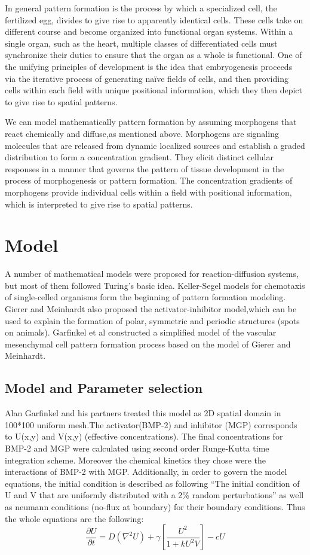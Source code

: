 \documentclass[12pt]{article}
\begin{document}
  In general pattern formation is the process by which a specialized cell, the fertilized egg, divides to give rise to apparently identical cells. These cells take on different course and become organized into functional organ systems. 
  Within a single organ, such as the heart, multiple classes of differentiated cells must synchronize their duties to ensure that the organ as a whole is functional. 
  One of the unifying principles of development is the idea that embryogenesis proceeds via the iterative process of generating naïve fields of cells, and then providing cells within each field with unique positional information, which they then depict to give rise to spatial patterns.
  
  
  We can model mathematically pattern formation by assuming morphogens that react chemically and diffuse,as mentioned above. Morphogens are signaling molecules that are released from dynamic localized sources and establish a graded distribution to form a concentration gradient. They elicit distinct cellular responses in a manner that governs the pattern of tissue development in the process of morphogenesis or pattern formation. 
  The concentration gradients of morphogens provide individual cells within a field with positional information, which is interpreted to give rise to spatial patterns.
  \section{Model}
  A number of mathematical models were proposed for reaction-diffusion systems, but most of them followed Turing's basic idea.
  Keller-Segel models	for chemotaxis of single-celled organisms form the beginning of pattern formation modeling. Gierer and Meinhardt also proposed the activator-inhibitor model,which can be used to explain the formation of polar, symmetric and periodic structures (spots on animals). Garfinkel et al constructed a simplified model of the vascular mesenchymal cell pattern formation process based on the model of Gierer and Meinhardt.
  \subsection{Model and Parameter selection}
  Alan Garfinkel and his partners treated this model as 2D spatial domain in 100*100 uniform mesh.The activator(BMP-2) and inhibitor (MGP) corresponds to U(x,y) and V(x,y) (effective concentrations). 
  The final concentrations for BMP-2 and MGP were calculated using second order Runge-Kutta time integration scheme.
  Moreover the chemical kinetics they chose were the interactions of BMP-2 with MGP. Additionally, in order to govern the model equations, the initial condition is described as following “The initial condition of U and V that are uniformly distributed with a 2\% random perturbations” as well as neumann conditions (no-flux at boundary) for their boundary conditions. Thus the whole equations are the following: 
  \begin{equation}
  \frac{\partial U}{\partial t}=D({\nabla}^2 U) + \gamma[\frac{U^2}{1+k{U}^2V}] - cU	
  \label{eq:1}
  \end{equation}
  
\end{document}
